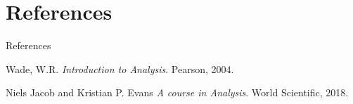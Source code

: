 \documentclass{beamer}
\begin{document}
\section{References}


\begin{frame}{References}
\small
    \begin{thebibliography}{}


        Wade, W.R.
        \newblock \emph{Introduction to Analysis}.
        \newblock Pearson, 2004.

        Niels Jacob and Kristian P. Evans
        \newblock \emph{A course in Analysis}.
        \newblock World Scientific, 2018.

        
    \end{thebibliography}
\end{frame}
\end{document}
